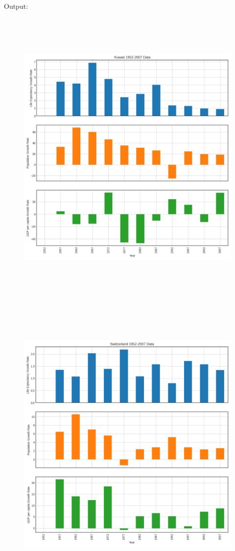 \documentclass[a4paper,11pt,openright]{report}
\begin{document}
\begin{enumerate}
Output:
\begin{figure}[ht!]
\includegraphics[width=30cm,height=15cm,keepaspectratio]{Kuwait.pdf}
\centering
\end{figure}

\begin{figure}[ht!]
\includegraphics[width=30cm,height=15cm,keepaspectratio]{Switzerland.pdf}
\centering
\end{figure}


\end{enumerate}
\end{document}

